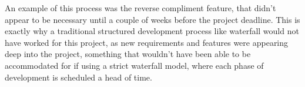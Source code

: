 An example of this process was the reverse compliment feature, that didn't appear to be necessary until a couple of weeks before the project deadline. This is exactly why a traditional structured development process like waterfall would not have worked for this project, as new requirements and features were appearing deep into the project, something that wouldn't have been able to be accommodated for if using a strict waterfall model, where each phase of development is scheduled a head of time.


